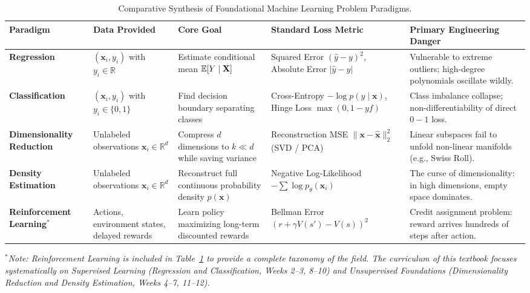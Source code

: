 \begin{table}[htbp]
\centering
\footnotesize
\setlength{\tabcolsep}{3.5pt}
\begin{tabularx}{\textwidth}{lp{2.4cm}p{2.6cm}p{2.8cm}X}
\toprule
\textbf{Paradigm} & \textbf{Data Provided} & \textbf{Core Goal} & \textbf{Standard Loss Metric} & \textbf{Primary Engineering Danger} \\
\midrule
\textbf{Regression} & $(\mathbf{x}_i, y_i)$ with $y_i \in \mathbb{R}$ & Estimate conditional mean $\operatorname{\mathbb{E}}[Y \mid \mathbf{X}]$ & Squared Error $(\hat{y} - y)^2$, Absolute Error $|\hat{y} - y|$ & Vulnerable to extreme outliers; high-degree polynomials oscillate wildly. \\
\addlinespace
\textbf{Classification} & $(\mathbf{x}_i, y_i)$ with $y_i \in \{0, 1\}$ & Find decision boundary separating classes & Cross-Entropy $-\log p(y \mid \mathbf{x})$, Hinge Loss $\max(0, 1 - y f)$ & Class imbalance collapse; non-differentiability of direct $0-1$ loss. \\
\addlinespace
\textbf{Dimensionality Reduction} & Unlabeled observations $\mathbf{x}_i \in \mathbb{R}^d$ & Compress $d$ dimensions to $k \ll d$ while saving variance & Reconstruction MSE $\|\mathbf{x} - \hat{\mathbf{x}}\|_2^2$ (SVD / PCA) & Linear subspaces fail to unfold non-linear manifolds (e.g., Swiss Roll). \\
\addlinespace
\textbf{Density Estimation} & Unlabeled observations $\mathbf{x}_i \in \mathbb{R}^d$ & Reconstruct full continuous probability density $p(\mathbf{x})$ & Negative Log-Likelihood $-\sum \log p_\theta(\mathbf{x}_i)$ & The curse of dimensionality: in high dimensions, empty space dominates. \\
\addlinespace
\textbf{Reinforcement Learning}$^*$ & Actions, environment states, delayed rewards & Learn policy maximizing long-term discounted rewards & Bellman Error $(r + \gamma V(s') - V(s))^2$ & Credit assignment problem: reward arrives hundreds of steps after action. \\
\bottomrule
\end{tabularx}
\caption{Comparative Synthesis of Foundational Machine Learning Problem Paradigms.}
\label{tab:ml_paradigms_synthesis}
\end{table}
\noindent\footnotesize\textit{$^*$Note: Reinforcement Learning is included in Table~\ref{tab:ml_paradigms_synthesis} to provide a complete taxonomy of the field. The curriculum of this textbook focuses systematically on Supervised Learning (Regression and Classification, Weeks 2--3, 8--10) and Unsupervised Foundations (Dimensionality Reduction and Density Estimation, Weeks 4--7, 11--12).}


